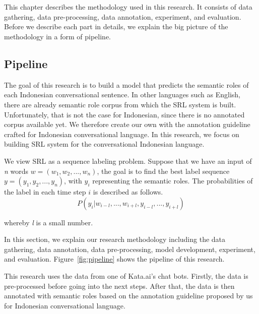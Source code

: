 \chapter{\babTiga}\label{bab:tiga}
This chapter describes the methodology used in this research. It consists of data gathering, data pre-processing, data annotation, experiment, and evaluation. Before we describe each part in details, we explain the big picture of the methodology in a form of pipeline.

\section{Pipeline}
The goal of this research is to build a model that predicts the semantic roles of each Indonesian conversational sentence. In other languages such as English, there are already semantic role corpus from which the SRL system is built. Unfortunately, that is not the case for Indonesian, since there is no annotated corpus available yet. We therefore create our own with the annotation guideline crafted for Indonesian conversational language. In this research, we focus on building SRL system for the conversational Indonesian language. 

We view SRL as a sequence labeling problem. Suppose that we have an input of \textit{n} words $w = (w_{1}, w_{2}, ..., w_{n})$, the goal is to find the best label sequence $y = (y_{1}, y_{2}, ..., y_{n})$, with $y_{i}$ representing the semantic roles. The probabilities of the label in each time step $i$ is described as follows.
\begin{equation}
P(y_{i}|w_{i-l}, ..., w_{i+l},y_{i-l}, ..., y_{i+l})
\end{equation}

whereby \textit{l} is a small number. 

In this section, we explain our research methodology including the data gathering, data annotation, data pre-processing, model development, experiment, and evaluation. Figure~\ref{fig:pipeline} shows the pipeline of this research.

This research uses the data from one of Kata.ai's chat bots. Firstly, the data is pre-processed before going into the next steps. After that, the data is then annotated with semantic roles based on the annotation guideline proposed by us for Indonesian conversational language.

